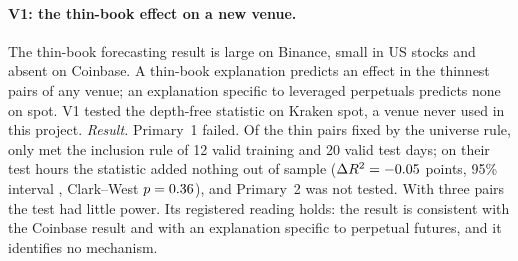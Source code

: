 \paragraph{V1: the thin-book effect on a new venue.} The thin-book forecasting result is large on Binance, small in US stocks and absent on Coinbase. A thin-book explanation predicts an effect in the thinnest pairs of any venue; an explanation specific to leveraged perpetuals predicts none on spot. V1 tested the depth-free statistic on Kraken spot, a venue never used in this project. \emph{Result.} Primary~1 failed. Of the \VonePairs{} thin pairs fixed by the universe rule, only \VoneIncluded{} met the inclusion rule of 12 valid training and 20 valid test days; on their \VoneTestHours{} test hours the statistic added nothing out of sample ($\Delta R^2=-0.05$ points, 95\% interval \VoneDRtwoCI{}, Clark--West $p=0.36$), and Primary~2 was not tested. With three pairs the test had little power. Its registered reading holds: the result is consistent with the Coinbase result and with an explanation specific to perpetual futures, and it identifies no mechanism.

